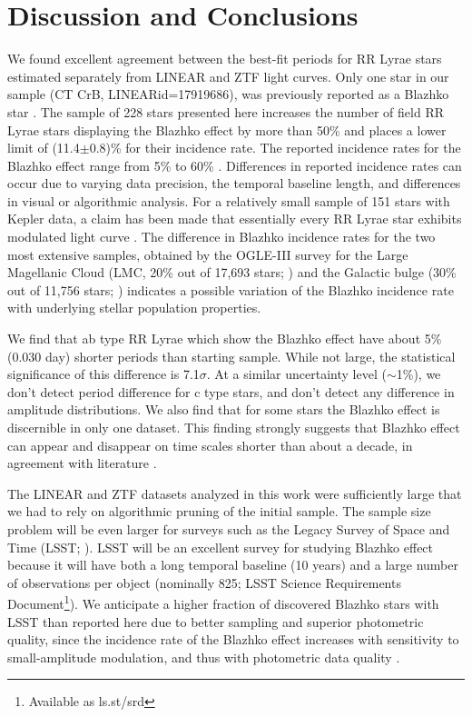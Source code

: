 
\section{Discussion and Conclusions\label{sec:discussion}}

We found excellent agreement
between the best-fit periods for RR Lyrae stars estimated separately from LINEAR and ZTF light curves. 
Only one star in our sample (CT CrB, LINEARid=17919686), was previously reported as a Blazhko star \citep{2013A&A...549A.101S}.
The sample of 228 stars presented here increases the number of field RR Lyrae stars displaying the Blazhko
effect by more than 50\% and places a lower limit of (11.4$\pm$0.8)\%
for their incidence rate. The reported incidence rates for the Blazhko effect
range from 5\% \citep{2007MNRAS.377.1263S} to 60\% \citep{2014A&A...570A.100S}.
Differences in reported incidence rates can occur due to varying data precision, the temporal baseline length, and differences in visual or algorithmic analysis.
For a relatively small sample of
151 stars with Kepler data, a claim has been made that essentially every RR Lyrae star exhibits modulated light curve
\citep{2018A&A...614L...4K}. The difference in Blazhko incidence rates for the two most extensive samples, obtained
by the OGLE-III survey for the Large Magellanic Cloud (LMC, 20\% out of 17,693 stars; \citealt{2009AcA....59....1S})
and the Galactic bulge (30\% out of 11,756 stars; \citealt{2011AcA....61....1S}) indicates a possible variation of
the Blazhko incidence rate with underlying stellar population properties. 
 
We find that ab type RR Lyrae which show the Blazhko effect have about 5\% (0.030 day) shorter periods than starting
sample. While not large, the statistical significance of this difference is 7.1$\sigma$. At a similar uncertainty level
($\sim$1\%), we don't detect period difference for c type stars, and don't detect any difference in amplitude distributions.
We also find that for some stars the Blazhko effect is discernible in only one dataset. This finding  strongly suggests that Blazhko effect can
appear and disappear on time scales shorter than about a decade, in agreement with literature 
\citep{2009MNRAS.400.1006J, 2010A&A...520A.108P, 2014ApJS..213...31B}. 


The LINEAR and ZTF datasets analyzed in this work were sufficiently large that we had to rely on algorithmic
pruning of the initial sample. The sample size problem will be even larger for surveys such as the Legacy Survey
of Space and Time (LSST; \citealt{2019ApJ...873..111I}). LSST will be an excellent survey for studying Blazhko effect
\citep{2022ApJS..258....4H} because it will have both a long temporal baseline (10 years) and a large number of
observations per object (nominally 825; LSST Science Requirements Document\footnote{Available as ls.st/srd}).
We anticipate a higher fraction of discovered Blazhko stars with LSST than reported here due to better sampling
and superior photometric quality, since the incidence rate of the Blazhko effect increases with sensitivity to
small-amplitude modulation, and thus with photometric data quality \citep{2009MNRAS.400.1006J}.

